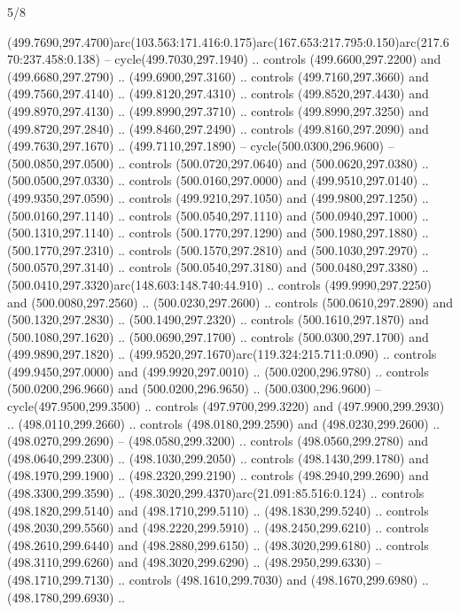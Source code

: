 \begin{flagdescription}{5/8}
\begin{scope}[xshift=0.5\flaglength,yshift=0.5\flagwidth,scale=\flagwidth/475.63]
\begin{scope}[y=0.8pt, x=0.8pt, yscale=-1, xscale=1,shift={(-450,-300)}]
\begin{scope}[cm={{1.0,0.0,0.0,1.0,(-0.0002,0.12556)}},cm={{1.0,0.0,0.0,1.0,(0.00179,0.0)}}]
\begin{scope}[cm={{1.11592,0.0,0.0,1.11592,(-106.89933,-41.77764)}}]
\begin{scope}[draw=black,fill=cfff]
\begin{scope}[fill=black]
  (499.7690,297.4700)arc(103.563:171.416:0.175)arc(167.653:217.795:0.150)arc(217.670:237.458:0.138)
  -- cycle(499.7030,297.1940) .. controls (499.6600,297.2200) and
  (499.6680,297.2790) .. (499.6900,297.3160) .. controls (499.7160,297.3660) and
  (499.7560,297.4140) .. (499.8120,297.4310) .. controls (499.8520,297.4430) and
  (499.8970,297.4130) .. (499.8990,297.3710) .. controls (499.8990,297.3250) and
  (499.8720,297.2840) .. (499.8460,297.2490) .. controls (499.8160,297.2090) and
  (499.7630,297.1670) .. (499.7110,297.1890) -- cycle(500.0300,296.9600) --
  (500.0850,297.0500) .. controls (500.0720,297.0640) and (500.0620,297.0380) ..
  (500.0500,297.0330) .. controls (500.0160,297.0000) and (499.9510,297.0140) ..
  (499.9350,297.0590) .. controls (499.9210,297.1050) and (499.9800,297.1250) ..
  (500.0160,297.1140) .. controls (500.0540,297.1110) and (500.0940,297.1000) ..
  (500.1310,297.1140) .. controls (500.1770,297.1290) and (500.1980,297.1880) ..
  (500.1770,297.2310) .. controls (500.1570,297.2810) and (500.1030,297.2970) ..
  (500.0570,297.3140) .. controls (500.0540,297.3180) and (500.0480,297.3380) ..
  (500.0410,297.3320)arc(148.603:148.740:44.910) .. controls (499.9990,297.2250)
  and (500.0080,297.2560) .. (500.0230,297.2600) .. controls (500.0610,297.2890)
  and (500.1320,297.2830) .. (500.1490,297.2320) .. controls (500.1610,297.1870)
  and (500.1080,297.1620) .. (500.0690,297.1700) .. controls (500.0300,297.1700)
  and (499.9890,297.1820) .. (499.9520,297.1670)arc(119.324:215.711:0.090) ..
  controls (499.9450,297.0000) and (499.9920,297.0010) .. (500.0200,296.9780) ..
  controls (500.0200,296.9660) and (500.0200,296.9650) .. (500.0300,296.9600) --
  cycle(497.9500,299.3500) .. controls (497.9700,299.3220) and
  (497.9900,299.2930) .. (498.0110,299.2660) .. controls (498.0180,299.2590) and
  (498.0230,299.2600) .. (498.0270,299.2690) -- (498.0580,299.3200) .. controls
  (498.0560,299.2780) and (498.0640,299.2300) .. (498.1030,299.2050) .. controls
  (498.1430,299.1780) and (498.1970,299.1900) .. (498.2320,299.2190) .. controls
  (498.2940,299.2690) and (498.3300,299.3590) ..
  (498.3020,299.4370)arc(21.091:85.516:0.124) .. controls (498.1820,299.5140)
  and (498.1710,299.5110) .. (498.1830,299.5240) .. controls (498.2030,299.5560)
  and (498.2220,299.5910) .. (498.2450,299.6210) .. controls (498.2610,299.6440)
  and (498.2880,299.6150) .. (498.3020,299.6180) .. controls (498.3110,299.6260)
  and (498.3020,299.6290) .. (498.2950,299.6330) -- (498.1710,299.7130) ..
  controls (498.1610,299.7030) and (498.1670,299.6980) .. (498.1780,299.6930) ..

\end{scope}
\end{scope}
\end{scope}
\end{scope}
\end{scope}
\end{scope}
\end{flagdescription}
